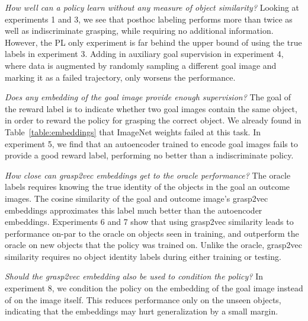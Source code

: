\documentclass{article}
\begin{document}
\textit{How well can a policy learn without any measure of object similarity?} Looking at experiments 1 and 3, we see that posthoc labeling performs more than twice as well as indiscriminate grasping, while requiring no additional information. However, the PL only experiment is far behind the upper bound of using the true labels in experiment 3. Adding in auxiliary goal supervision in experiment 4, where data is augmented by randomly sampling a different goal image and marking it as a failed trajectory, only worsens the performance.

\textit{Does any embedding of the goal image provide enough supervision?} The goal of the reward label is to indicate whether two goal images contain the same object, in order to reward the policy for grasping the correct object. We already found in Table~\ref{table:embeddings} that ImageNet weights failed at this task. In experiment 5, we find that an autoencoder trained to encode goal images fails to provide a good reward label, performing no better than a indiscriminate policy.

\textit{How close can grasp2vec embeddings get to the oracle performance?}
The oracle labels requires knowing the true identity of the objects in the goal an outcome images. The cosine similarity of the goal and outcome image's grasp2vec embeddings approximates this label much better than the autoencoder embeddings. Experiments 6 and 7 show that using grasp2vec similarity leads to performance on-par to the oracle on objects seen in training, and outperform the oracle on new objects that the policy was trained on. Unlike the oracle, grasp2vec similarity requires no object identity labels during either training or testing.

\textit{Should the grasp2vec embedding also be used to condition the policy?} In experiment 8, we condition the policy on the embedding of the goal image instead of on the image itself. This reduces performance only on the unseen objects, indicating that the embeddings may hurt generalization by a small margin.
\end{document}
